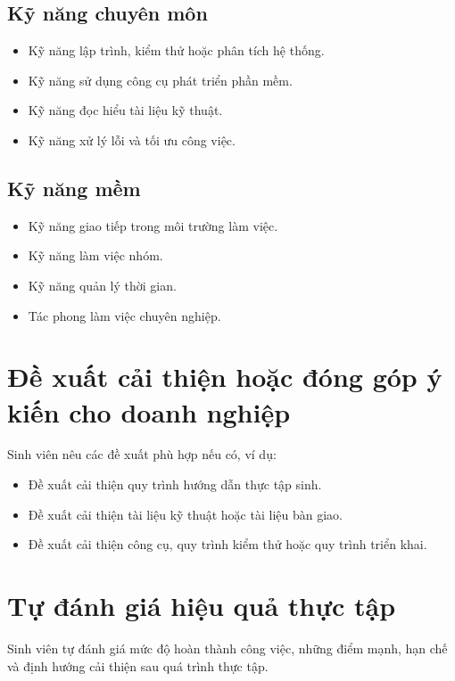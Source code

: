 \subsection{Kỹ năng chuyên môn}

\begin{itemize}
    \item Kỹ năng lập trình, kiểm thử hoặc phân tích hệ thống.
    \item Kỹ năng sử dụng công cụ phát triển phần mềm.
    \item Kỹ năng đọc hiểu tài liệu kỹ thuật.
    \item Kỹ năng xử lý lỗi và tối ưu công việc.
\end{itemize}

\subsection{Kỹ năng mềm}

\begin{itemize}
    \item Kỹ năng giao tiếp trong môi trường làm việc.
    \item Kỹ năng làm việc nhóm.
    \item Kỹ năng quản lý thời gian.
    \item Tác phong làm việc chuyên nghiệp.
\end{itemize}

\section{Đề xuất cải thiện hoặc đóng góp ý kiến cho doanh nghiệp}

Sinh viên nêu các đề xuất phù hợp nếu có, ví dụ:

\begin{itemize}
    \item Đề xuất cải thiện quy trình hướng dẫn thực tập sinh.
    \item Đề xuất cải thiện tài liệu kỹ thuật hoặc tài liệu bàn giao.
    \item Đề xuất cải thiện công cụ, quy trình kiểm thử hoặc quy trình triển khai.
\end{itemize}

\section{Tự đánh giá hiệu quả thực tập}

Sinh viên tự đánh giá mức độ hoàn thành công việc, những điểm mạnh, hạn chế và định hướng cải thiện sau quá trình thực tập.
